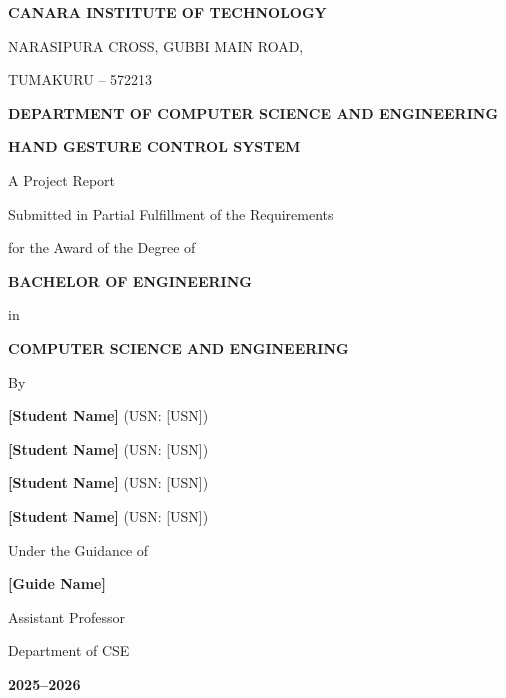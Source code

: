 \documentclass[12pt,a4paper]{report}
\begin{document}
\thispagestyle{frontmatter}
\begin{titlepage}
    \centering
    \vspace*{1cm}
    
    {\LARGE \textbf{CANARA INSTITUTE OF TECHNOLOGY}\par}
    {\large NARASIPURA CROSS, GUBBI MAIN ROAD,\par}
    {\large TUMAKURU -- 572213\par}
    
    \vspace{1.5cm}
    
    {\Large \textbf{DEPARTMENT OF COMPUTER SCIENCE AND ENGINEERING}\par}
    
    \vspace{2cm}
    
    {\LARGE \textbf{HAND GESTURE CONTROL SYSTEM}\par}
    
    \vspace{1cm}
    
    {\large A Project Report\par}
    {\large Submitted in Partial Fulfillment of the Requirements\par}
    {\large for the Award of the Degree of\par}
    
    \vspace{0.5cm}
    
    {\Large \textbf{BACHELOR OF ENGINEERING}\par}
    {\large in\par}
    {\Large \textbf{COMPUTER SCIENCE AND ENGINEERING}\par}
    
    \vspace{1cm}
    
    {\large By\par}
    
    \vspace{0.5cm}
    
    {\large \textbf{[Student Name]} (USN: [USN])\par}
    {\large \textbf{[Student Name]} (USN: [USN])\par}
    {\large \textbf{[Student Name]} (USN: [USN])\par}
    {\large \textbf{[Student Name]} (USN: [USN])\par}
    
    \vspace{1cm}
    
    {\large Under the Guidance of\par}
    {\large \textbf{[Guide Name]}\par}
    {\large Assistant Professor\par}
    {\large Department of CSE\par}
    
    \vfill
    
    {\large \textbf{2025--2026}\par}
\end{titlepage}
\end{document}
